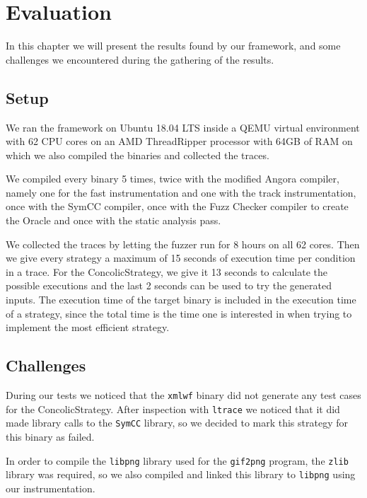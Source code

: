 
\chapter{Evaluation}\label{chap:evaluation} %
In this chapter we will present the results found by our framework, and some challenges we encountered during the gathering of the results.

\section{Setup}
We ran the framework on Ubuntu 18.04 LTS inside a QEMU virtual environment with 62 CPU cores on an AMD ThreadRipper  processor with 64GB of RAM on which we also compiled the binaries and collected the traces.

We compiled every binary 5 times, twice with the modified Angora compiler, namely one for the fast instrumentation and one with the track instrumentation, once with the SymCC compiler, once with the Fuzz Checker compiler to create the Oracle and once with the static analysis pass.

We collected the traces by letting the fuzzer run for 8 hours on all 62 cores. Then we give every strategy a maximum of 15 seconds of execution time per condition in a trace. For the ConcolicStrategy, we give it 13 seconds to calculate the possible executions and the last 2 seconds can be used to try the generated inputs. The execution time of the target binary is included in the execution time of a strategy, since the total time is the time one is interested in when trying to implement the most efficient strategy.

\section{Challenges}
During our tests we noticed that the \texttt{xmlwf} binary did not generate any test cases for the ConcolicStrategy. After inspection with \texttt{ltrace} we noticed that it did made library calls to the \texttt{SymCC} library, so we decided to mark this strategy for this binary as failed.

In order to compile the \texttt{libpng} library used for the \texttt{gif2png} program, the \texttt{zlib} library was required, so we also compiled and linked this library to \texttt{libpng} using our instrumentation. 

